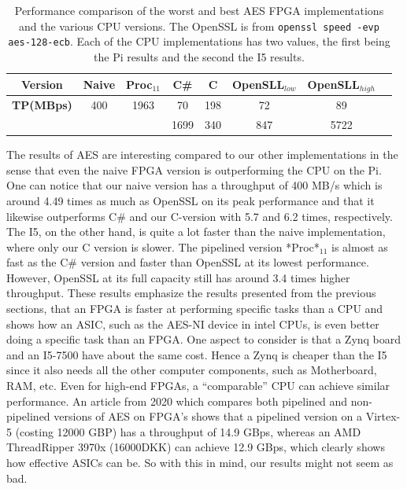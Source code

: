 \documentclass[a4paper, openany]{book}
\begin{document}
\begin{abstact}
\begin{table}[H]
\centering
\captionsetup{width=.8\linewidth}
\begin{tabular}{c c c c c c c c}
\hline
\textbf{Version} & Naive & Proc$_{11}$ & C\# & C & OpenSLL$_{low}$ & OpenSLL$_{high}$\\
\hline
\textbf{TP(MBps)} & 400 & 1963 &    70& 198 & 72  & 89\\
                  &     &      & 1699 & 340 & 847 & 5722
\end{tabular}
\caption[AES: FPGA and CPU comparisons]%
{Performance comparison of the worst and best AES FPGA implementations and the various CPU versions. The OpenSSL is from \texttt{openssl speed -evp aes-128-ecb}. Each of the CPU implementations has two values, the first being the Pi results and the second the I5 results.}
\label{tab:AEScompare}
\end{table}
The results of AES are interesting compared to our other implementations in the sense that even the naive FPGA version is outperforming the CPU on the Pi. One can notice that our naive version has a throughput of 400 MB/s which is around 4.49 times as much as OpenSSL on its peak performance and that it likewise outperforms C\# and our C-version with 5.7 and 6.2 times, respectively. The I5, on the other hand, is quite a lot faster than the naive implementation, where only our C version is slower. The pipelined version *Proc*\(_{11}\) is almost as fast as the C\# version and faster than OpenSSL at its lowest performance. However, OpenSSL at its full capacity still has around 3.4 times higher throughput. These results emphasize the results presented from the previous sections, that an FPGA is faster at performing specific tasks than a CPU and shows how an ASIC, such as the AES-NI device in intel CPUs, is even better doing a specific task than an FPGA. One aspect to consider is that a Zynq board and an I5-7500 have about the same cost. Hence a Zynq is cheaper than the I5 since it also needs all the other computer components, such as Motherboard, RAM, etc.
Even for high-end FPGAs, a ``comparable'' CPU can achieve similar performance.
An article from 2020 which compares both pipelined and non-pipelined versions of AES on FPGA's shows that a pipelined version on a Virtex-5 (costing 12000 GBP) has a throughput of 14.9 GBps\cite{Zodpe}, whereas an AMD ThreadRipper 3970x (16000DKK) can achieve 12.9 GBps, which clearly shows how effective ASICs can be. So with this in mind, our results might not seem as bad.


\end{abstact}
\end{document}
